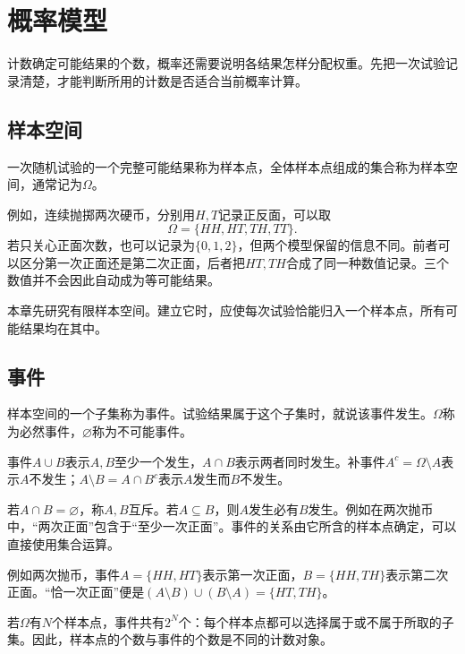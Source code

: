 \FloatBarrier
\newpage
\section{概率模型}
\label{sec:prob-models}

计数确定可能结果的个数，概率还需要说明各结果怎样分配权重。先把一次试验记录清楚，才能判断所用的计数是否适合当前概率计算。

\subsection{样本空间}

\begin{definition}
一次随机试验的一个完整可能结果称为{\heiti 样本点}，全体样本点组成的集合称为{\heiti 样本空间}，通常记为\(\Omega\)。
\end{definition}

例如，连续抛掷两次硬币，分别用\(H,T\)记录正反面，可以取
\[
 \Omega=\{HH,HT,TH,TT\}.
\]
若只关心正面次数，也可以记录为\(\{0,1,2\}\)，但两个模型保留的信息不同。前者可以区分第一次正面还是第二次正面，后者把\(HT,TH\)合成了同一种数值记录。三个数值并不会因此自动成为等可能结果。

本章先研究有限样本空间。建立它时，应使每次试验恰能归入一个样本点，所有可能结果均在其中。

\subsection{事件}

\begin{definition}
样本空间的一个子集称为{\heiti 事件}。试验结果属于这个子集时，就说该事件发生。\(\Omega\)称为必然事件，\(\varnothing\)称为不可能事件。
\end{definition}

事件\(A\cup B\)表示\(A,B\)至少一个发生，\(A\cap B\)表示两者同时发生。补事件\(A^c=\Omega\setminus A\)表示\(A\)不发生；\(A\setminus B=A\cap B^c\)表示\(A\)发生而\(B\)不发生。

若\(A\cap B=\varnothing\)，称\(A,B\)互斥。若\(A\subseteq B\)，则\(A\)发生必有\(B\)发生。例如在两次抛币中，“两次正面”包含于“至少一次正面”。事件的关系由它所含的样本点确定，可以直接使用集合运算。

例如两次抛币，事件\(A=\{HH,HT\}\)表示第一次正面，\(B=\{HH,TH\}\)表示第二次正面。“恰一次正面”便是\((A\setminus B)\cup(B\setminus A)=\{HT,TH\}\)。

若\(\Omega\)有\(N\)个样本点，事件共有\(2^N\)个：每个样本点都可以选择属于或不属于所取的子集。因此，样本点的个数与事件的个数是不同的计数对象。

